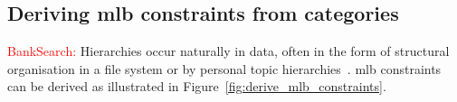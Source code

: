 \subsection{Deriving \ac{mlb} constraints from categories}

\textcolor{red}{BankSearch:}
Hierarchies occur naturally in data, often in the form of structural organisation in a file system or by personal topic hierarchies~\cite{bade_creating_2008}.
\ac{mlb} constraints can be derived as illustrated in Figure~\ref{fig:derive_mlb_constraints}.

\deriveMLBconstraints{}